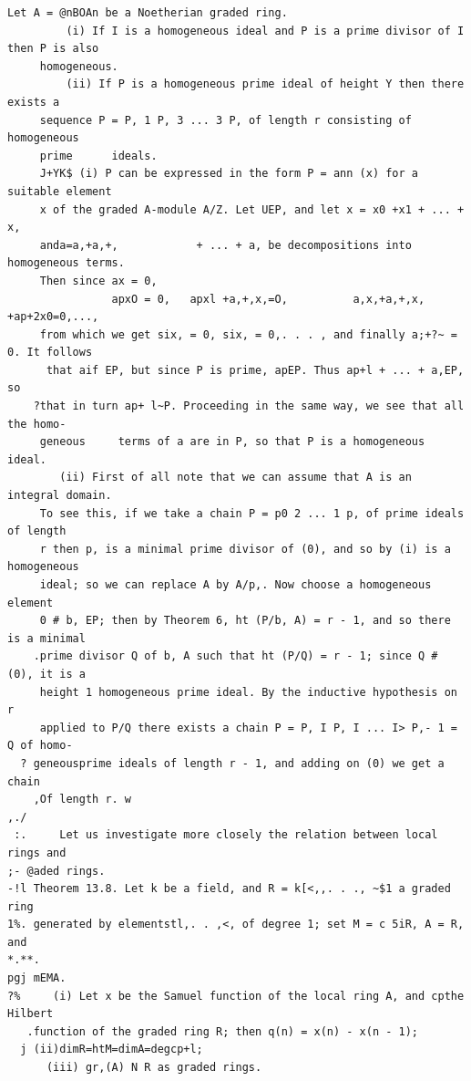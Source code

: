 \begin{theorem}\label{mcrt-auto-theorem-13-7}\uses{}
\begin{verbatim}
Let A = @nBOAn be a Noetherian graded ring.
         (i) If I is a homogeneous ideal and P is a prime divisor of I then P is also
     homogeneous.
         (ii) If P is a homogeneous prime ideal of height Y then there exists a
     sequence P = P, 1 P, 3 ... 3 P, of length r consisting of homogeneous
     prime      ideals.
     J+YK$ (i) P can be expressed in the form P = ann (x) for a suitable element
     x of the graded A-module A/Z. Let UEP, and let x = x0 +x1 + ... + x,
     anda=a,+a,+,            + ... + a, be decompositions into homogeneous terms.
     Then since ax = 0,
                apxO = 0,   apxl +a,+,x,=O,          a,x,+a,+,x,       +ap+2x0=0,...,
     from which we get six, = 0, six, = 0,. . . , and finally a;+?~ = 0. It follows
      that aif EP, but since P is prime, apEP. Thus ap+l + ... + a,EP, so
    ?that in turn ap+ l~P. Proceeding in the same way, we see that all the homo-
     geneous     terms of a are in P, so that P is a homogeneous ideal.
        (ii) First of all note that we can assume that A is an integral domain.
     To see this, if we take a chain P = p0 2 ... 1 p, of prime ideals of length
     r then p, is a minimal prime divisor of (0), and so by (i) is a homogeneous
     ideal; so we can replace A by A/p,. Now choose a homogeneous element
     0 # b, EP; then by Theorem 6, ht (P/b, A) = r - 1, and so there is a minimal
    .prime divisor Q of b, A such that ht (P/Q) = r - 1; since Q # (0), it is a
     height 1 homogeneous prime ideal. By the inductive hypothesis on r
     applied to P/Q there exists a chain P = P, I P, I ... I> P,- 1 = Q of homo-
  ? geneousprime ideals of length r - 1, and adding on (0) we get a chain
    ,Of length r. w
,./
 :.     Let us investigate more closely the relation between local rings and
;- @aded rings.
-!l Theorem 13.8. Let k be a field, and R = k[<,,. . ., ~$1 a graded ring
1%. generated by elementstl,. . ,<, of degree 1; set M = c 5iR, A = R, and
*.**.
pgj mEMA.
?%     (i) Let x be the Samuel function of the local ring A, and cpthe Hilbert
   .function of the graded ring R; then q(n) = x(n) - x(n - 1);
  j (ii)dimR=htM=dimA=degcp+l;
      (iii) gr,(A) N R as graded rings.
\end{verbatim}
\end{theorem}
